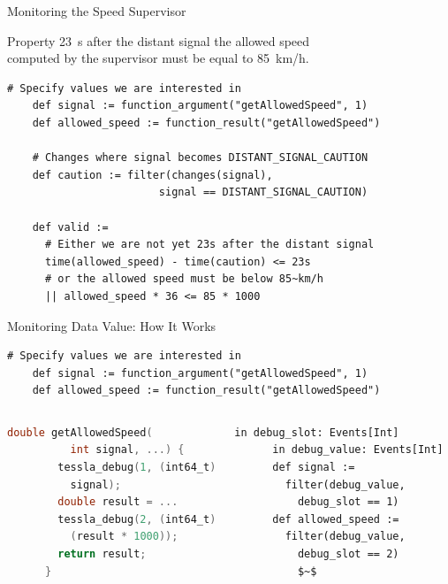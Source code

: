 \begin{frame}[fragile]{Monitoring the Speed Supervisor}
  \begin{block}{Property}
    23~s after the distant signal the allowed speed\\
    computed by the supervisor must be equal to 85~km/h.
  \end{block}

  \scriptsize

  \begin{lstlisting}[gobble=4,language=tessla]
    # Specify values we are interested in
    def signal := function_argument("getAllowedSpeed", 1)
    def allowed_speed := function_result("getAllowedSpeed")

    # Changes where signal becomes DISTANT_SIGNAL_CAUTION
    def caution := filter(changes(signal),
                        signal == DISTANT_SIGNAL_CAUTION)

    def valid :=
      # Either we are not yet 23s after the distant signal
      time(allowed_speed) - time(caution) <= 23s
      # or the allowed speed must be below 85~km/h
      || allowed_speed * 36 <= 85 * 1000
  \end{lstlisting}
\end{frame}

\begin{frame}[fragile]{Monitoring Data Value: How It Works}
  \scriptsize

  \begin{lstlisting}[gobble=4,language=tessla]
    # Specify values we are interested in
    def signal := function_argument("getAllowedSpeed", 1)
    def allowed_speed := function_result("getAllowedSpeed")
  \end{lstlisting}

  \xxx

  \begin{columns}
    \column{4.7cm}
    \vskip-3pt
      \begin{lstlisting}[gobble=6,language=C]
      double getAllowedSpeed(
          int signal, ...) {
        tessla_debug(1, (int64_t)
          signal);
        double result = ...
        tessla_debug(2, (int64_t)
          (result * 1000));
        return result;
      }
    \end{lstlisting}

    \column{4.7cm}
    \vskip-3pt
    \begin{lstlisting}[gobble=6,mathescape=true,language=tessla]
      in debug_slot: Events[Int]
      in debug_value: Events[Int]
      def signal :=
        filter(debug_value,
          debug_slot == 1)
      def allowed_speed :=
        filter(debug_value,
          debug_slot == 2)
          $~$
    \end{lstlisting}
  \end{columns}
\end{frame}
